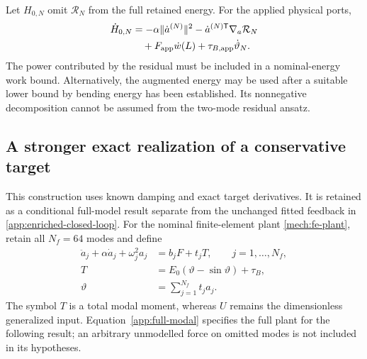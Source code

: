 Let $H_{0,N}$ omit $\mathcal R_N$ from the full retained energy.
For the applied physical ports,
\begin{align}
 \dot H_{0,N}
 &=-\alpha\|\dot a^{(N)}\|^2
       -\dot a^{(N)\mathsf T}\nabla_a\mathcal R_N\nonumber\\
 &\quad+F_{\rm app}\dot w(L)+\tau_{B,\rm app}\dot\vartheta_N.
 \label{sm:enriched-power}
\end{align}
The power contributed by the residual must be included in a
nominal-energy work bound. Alternatively, the augmented energy may be used after a
suitable lower bound by bending energy has been established. Its
nonnegative decomposition cannot be assumed from the two-mode
residual ansatz.

\subsection{A stronger exact realization of a conservative target}
\label{sm:exact-lift}
This construction uses known damping and exact target derivatives.
It is retained as a conditional full-model result separate from the
unchanged fitted feedback in \eqref{app:enriched-closed-loop}.
For the nominal finite-element plant \eqref{mech:fe-plant}, retain all
$N_f=64$ modes and define
\begin{align}
 \ddot a_j+\alpha\dot a_j+\omega_j^2a_j&=b_jF+t_jT,
       \qquad j=1,\ldots,N_f,\nonumber\\
 T&=E_0(\vartheta-\sin\vartheta)+\tau_B,\nonumber\\
 \vartheta&=\sum_{j=1}^{N_f}t_ja_j.
 \label{app:full-modal}
\end{align}
The symbol $T$ is a total modal moment, whereas $U$ remains the
dimensionless generalized input. Equation~\eqref{app:full-modal}
specifies the full plant for the following result; an arbitrary
unmodelled force on omitted modes is not included in its hypotheses.

